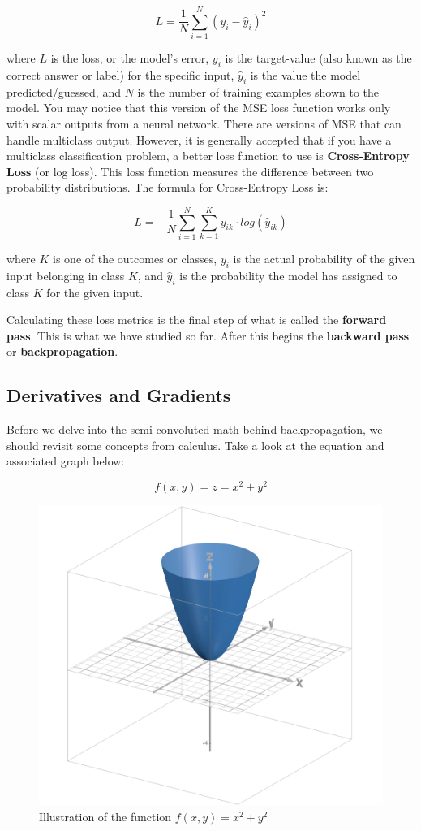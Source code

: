     $$L = \frac{1}{N} \sum^{N}_{i=1} (y_i - \hat{y}_i)^2$$
    
    where $L$ is the loss, or the model's error, $y_i$ is the target-value (also known as the correct answer or label) for the specific input, $\hat{y}_i$ is the value the model predicted/guessed, and $N$ is the number of training examples shown to the model. You may notice that this version of the MSE loss function works only with scalar outputs from a neural network. There are versions of MSE that can handle multiclass output. However, it is generally accepted that if you have a multiclass classification problem, a better loss function to use is \textbf{Cross-Entropy Loss} (or log loss). This loss function measures the difference between two probability distributions. The formula for Cross-Entropy Loss is: 
    
    $$ L = -\frac{1}{N}\sum^{N}_{i=1} \sum^{K}_{k=1} y_{ik} \cdot log(\hat{y}_{ik})$$
    
    where $K$ is one of the outcomes or classes, $y_i$ is the actual probability of the given input belonging in class $K$, and $\hat{y}_i$ is the probability the model has assigned to class $K$ for the given input. 
    
    Calculating these loss metrics is the final step of what is called the \textbf{forward pass}. This is what we have studied so far. After this begins the \textbf{backward pass} or \textbf{backpropagation}. 

\subsection{Derivatives and Gradients}
    \large Before we delve into the semi-convoluted math behind backpropagation, we should revisit some concepts from calculus. Take a look at the equation and associated graph below:

    $$f(x, y) = z = x^2 + y^2$$

    \begin{figure}[H]
        \centering
        \includegraphics[width=0.5\linewidth]{dl/x2y2.png}
        \caption{Illustration of the function $f(x, y) = x^2 + y^2$}
        \label{fig:x2y2}
    \end{figure}


